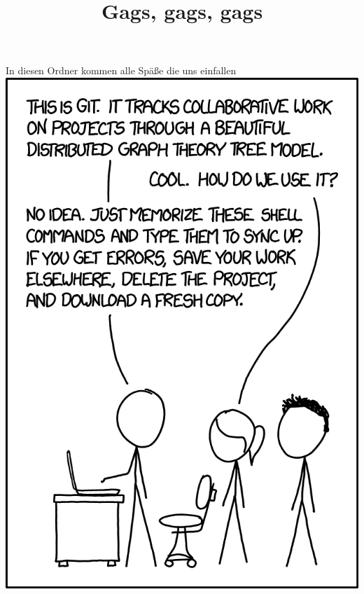 ﻿\documentclass{article}
\title{Gags, gags, gags}
\begin{document}
\maketitle

In diesen Ordner kommen alle Späße die uns einfallen
\includegraphics[width=0.5\linewidth]{git_2x.png}
\end{document}
